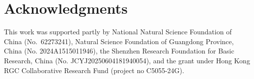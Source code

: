 \section*{Acknowledgments}
This work was supported partly by National Natural Science Foundation of China (No.~62273241), Natural Science Foundation of Guangdong Province, China (No. 2024A1515011946), the Shenzhen Research Foundation for Basic Research, China (No. JCYJ20250604181940054), and the grant under Hong Kong RGC Collaborative Research Fund (project no C5055-24G).
